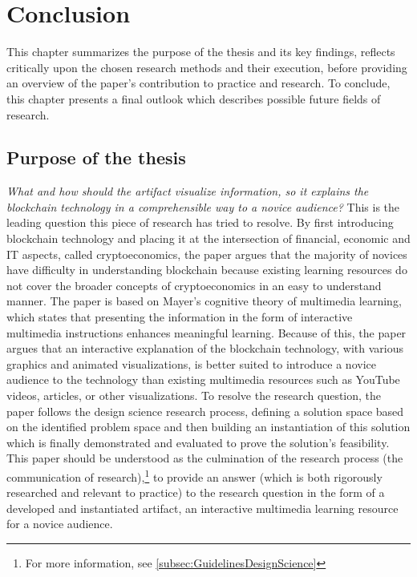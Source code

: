 \chapter{Conclusion} \label{chap:conclusion}

This chapter summarizes the purpose of the thesis and its key findings, reflects critically upon the chosen research methods and their execution, before providing an overview of the paper's contribution to practice and research. To conclude, this chapter presents a final outlook which describes possible future fields of research. 

\section{Purpose of the thesis} \label{sec:findings}
\textit{What and how should the artifact visualize information, so it explains the blockchain technology in a comprehensible way to a novice audience?} This is the leading question this piece of research has tried to resolve. By first introducing blockchain technology and placing it at the intersection of financial, economic and \ac{IT} aspects, called cryptoeconomics, the paper argues that the majority of novices have difficulty in understanding blockchain because existing learning resources do not cover the broader concepts of cryptoeconomics in an easy to understand manner. The paper is based on Mayer's cognitive theory of multimedia learning, which states that presenting the information in the form of interactive multimedia instructions enhances meaningful learning. Because of this, the paper argues that an interactive explanation of the blockchain technology, with various graphics and animated visualizations, is better suited to introduce a novice audience to the technology than existing multimedia resources such as YouTube videos, articles, or other visualizations. To resolve the research question, the paper follows the design science research process, defining a solution space based on the identified problem space and then building an instantiation of this solution which is finally demonstrated and evaluated to prove the solution's feasibility. This paper should be understood as the culmination of the research process (the communication of research),\footnote{For more information, see \ref{subsec:GuidelinesDesignScience}} to provide an answer (which is both rigorously researched and relevant to practice) to the research question in the form of a developed and instantiated artifact, an interactive multimedia learning resource for a novice audience. 

